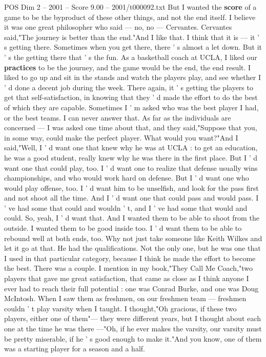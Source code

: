 \begin{textsample}{POS Dim 2 – 2001 – Score 9.00 – 2001/t000092.txt}
But I wanted the \textbf{score} of a game to be the byproduct of these other things, and not the end itself.
I believe it was one great philosopher who said — no, no — Cervantes.
Cervantes said,"The journey is better than the end."And I like that.
I think that it is — it ' s getting there.
Sometimes when you get there, there ' s almost a let down.
But it ' s the getting there that ' s the fun.
As a basketball coach at UCLA, I liked our \textbf{practices} to be the journey, and the game would be the end, the end result.
I liked to go up and sit in the stands and watch the players play, and see whether I ' d done a decent job during the week.
There again, it ' s getting the players to get that self-satisfaction, in knowing that they ' d made the effort to do the best of which they are capable.
Sometimes I ' m asked who was the best player I had, or the best teams.
I can never answer that.
As far as the individuals are concerned — I was asked one time about that, and they said,"Suppose that you, in some way, could make the perfect player.
What would you want?"And I said,"Well, I ' d want one that knew why he was at UCLA : to get an education, he was a good student, really knew why he was there in the first place.
But I ' d want one that could play, too.
I ' d want one to realize that defense usually wins championships, and who would work hard on defense.
But I ' d want one who would play offense, too.
I ' d want him to be unselfish, and look for the pass first and not shoot all the time.
And I ' d want one that could pass and would pass.
I ' ve had some that could and wouldn ' t, and I ' ve had some that would and could.
So, yeah, I ' d want that.
And I wanted them to be able to shoot from the outside.
I wanted them to be good inside too.
I ' d want them to be able to rebound well at both ends, too.
Why not just take someone like Keith Wilkes and let it go at that.
He had the qualifications.
Not the only one, but he was one that I used in that particular category, because I think he made the effort to become the best.
There was a couple.
I mention in my book,"They Call Me Coach,"two players that gave me great satisfaction, that came as close as I think anyone I ever had to reach their full potential : one was Conrad Burke, and one was Doug McIntosh.
When I saw them as freshmen, on our freshmen team — freshmen couldn ' t play varsity when I taught.
I thought,"Oh gracious, if these two players, either one of them"— they were different years, but I thought about each one at the time he was there —"Oh, if he ever makes the varsity, our varsity must be pretty miserable, if he ' s good enough to make it."And you know, one of them was a starting player for a season and a half.

\end{textsample}
